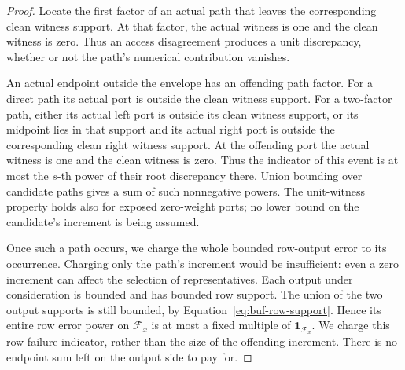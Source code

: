 \documentclass[11pt]{article}
\numberwithin{equation}{section}
\theoremstyle{definition}
\theoremstyle{remark}
\begin{document}
\begin{proof}
Locate the first factor of an actual path that leaves the corresponding clean witness support. At that factor, the actual witness is one and the clean witness is zero. Thus an access disagreement produces a unit discrepancy, whether or not the path's numerical contribution vanishes.

An actual endpoint outside the envelope has an offending path factor.
For a direct path its actual port is outside the clean witness support.
For a two-factor path, either its actual left port is outside its clean
witness support, or its midpoint lies in that support and its actual
right port is outside the corresponding clean right witness support.
At the offending port the actual witness is one and the clean witness
is zero.  Thus the indicator of this event is at most the $s$-th power
of their root discrepancy there.  Union bounding over candidate paths
gives a sum of such nonnegative powers.  The unit-witness property holds
also for exposed zero-weight ports; no lower bound on the candidate's
increment is being assumed.

Once such a path occurs, we charge the whole bounded row-output error to its occurrence. Charging only the path's increment would be insufficient: even a zero increment can affect the selection of representatives. Each output under consideration is bounded and has bounded row support.
The union of the two output supports is still bounded, by
Equation~\eqref{eq:buf-row-support}.  Hence its entire row error power on
$\mathcal F_x$ is at most a fixed multiple of
$\mathbf1_{\mathcal F_x}$.  We charge this row-failure indicator, rather
than the size of the offending increment.  There is no endpoint sum left
on the output side to pay for.


\end{proof}
\end{document}
